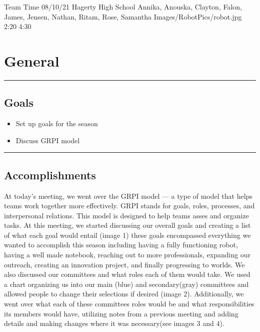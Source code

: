 \insertmeeting 
	{Team Time} 
	{08/10/21}
	{Hagerty High School}
	{Annika, Anouska, Clayton, Falon, James, Jensen, Nathan, Ritam, Rose, Samantha}
	{Images/RobotPics/robot.jpg}
	{2:20}
  {4:30}
	
\section*{General}
\noindent\hfil\rule{\textwidth}{.4pt}\hfil
\subsection*{Goals}
\begin{itemize}
    \item Set up goals for the season
	\item Discuss GRPI model

\end{itemize} 

\noindent\hfil\rule{\textwidth}{.4pt}\hfil

\subsection*{Accomplishments}
At today's meeting, we went over the GRPI model --- a type of model that helps teams work together more effectively. GRPI stands for goals, roles, processes, and interpersonal relations. This model is designed to help teams asses and organize tasks. At this meeting, we started discussing our overall goals and creating a list of what each goal would entail (image 1) these goals encompassed everything we wanted to accomplish this season including having a fully functioning robot, having a well made notebook, reaching out to more professionals, expanding our outreach, creating an innovation project, and finally progressing to worlds. 
We also discussed our committees and what roles each of them would take. We used a chart organizing us into our main (blue) and secondary(gray) committees and allowed people to change their selections if desired (image 2). Additionally, we went over what each of these committees roles would be and what responsibilities its members would have, utilizing notes from a previous meeting and adding details and making changes where it was necessary(see images 3 and 4).


